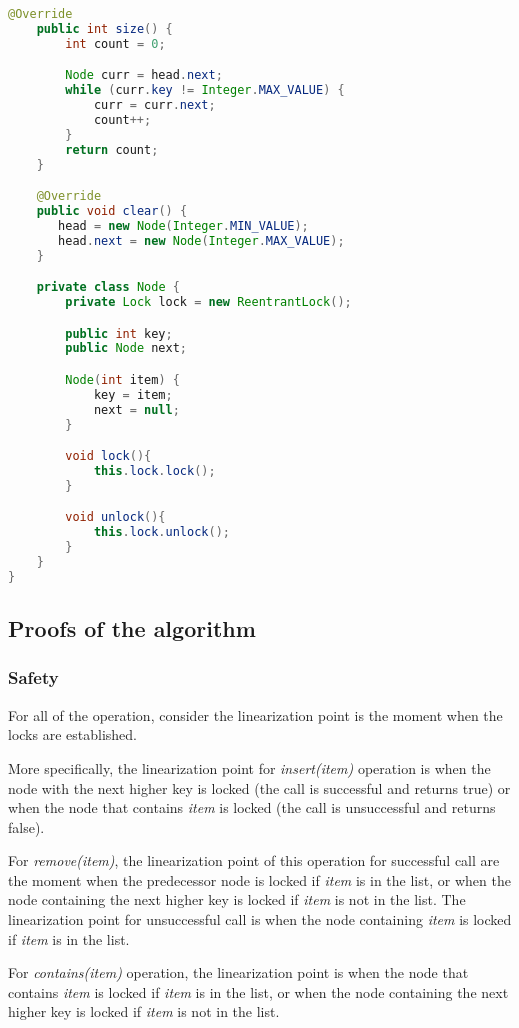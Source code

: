 \documentclass[12pt,a4paper]{article}
\begin{document}
\begin{lstlisting}[language=Java]
    @Override
    public int size() {
        int count = 0;

        Node curr = head.next;
        while (curr.key != Integer.MAX_VALUE) {
            curr = curr.next;
            count++;
        }
        return count;
    }

    @Override
    public void clear() {
       head = new Node(Integer.MIN_VALUE);
       head.next = new Node(Integer.MAX_VALUE);
    }

    private class Node {
        private Lock lock = new ReentrantLock();

        public int key;
        public Node next;

        Node(int item) {
            key = item;
            next = null;
        }

        void lock(){
            this.lock.lock();
        }

        void unlock(){
            this.lock.unlock();
        }
    }
}
\end{lstlisting}

\subsection{Proofs of the algorithm}
\subsubsection{Safety}
For all of the operation, consider the linearization point is the moment when the locks are established. 

More specifically, the linearization point for \textit{insert(item)} operation is when the node with the next higher key is locked (the call is successful and returns true) or when the node that contains \textit{item} is locked (the call is unsuccessful and returns false).

For \textit{remove(item)}, the linearization point of this operation for successful call are the moment when the predecessor node is locked if \textit{item} is in the list, or when the node containing the next higher key is locked if \textit{item} is not in the list. The linearization point for unsuccessful call is when the node containing \textit{item} is locked if \textit{item} is in the list.

For \textit{contains(item)} operation, the linearization point is when the node that contains \textit{item} is locked if \textit{item} is in the list, or when the node containing the next higher key is locked if \textit{item} is not in the list.
\end{document}

